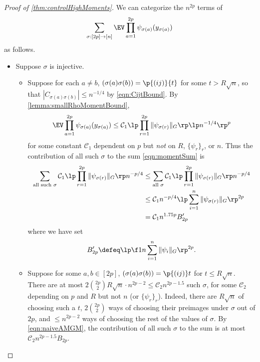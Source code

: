 \documentclass[main.tex]{subfiles}
\begin{document}
\begin{proof}[Proof of \cref{thm:controlHighMoments}]
\newcommand{\CC}{\mathcal{C}}

We can categorize the $n^{2p}$ terms of 
\begin{equation}
\sum_{\sigma: [2p] \to [n]} \EV\prod_{a=1}^{2p} \psi_{\sigma(a)}(y_{\sigma(a)})
\label{eqn:momentSum}
\end{equation}
as follows.
\begin{itemize}
    \item Suppose $\sigma$ is injective.
    \begin{itemize}
        \item
            Suppose for each $a\ne b$, $(\sigma(a)\sigma(b)) = \p{(ij)}{t}$ for some $t > R\sqrt n$, so that $|C_{\sigma(a)\sigma(b)}| \le n ^{-1/4}$ by \cref{eqn:CijtBound}.
            By \cref{lemma:smallRhoMomentBound}, 
            \[\EV \prod_{a=1}^{2p} \psi_{\sigma(a)}(y_{\sigma(a)}) \le \CC_1 \lp \prod_{r=1}^{2p} \|\psi_{\sigma(r)}\|_G\rp \lp n^{-1/4} \rp ^{p}\]
            for some constant $\CC_1$ dependent on $p$ but \emph{not} on $R$, $\{\psi_r\}_r$, or $n$.
            Thus the contribution of all such $\sigma$ to the sum \cref{eqn:momentSum} is
            \begin{align*}
                \sum_{\text{all such }\sigma} \CC_1 \lp \prod_{r=1}^{2p} \|\psi_{\sigma(r)}\|_G\rp n^{-p/4}
                    &\le
                        \sum_{\text{all }\sigma} \CC_1 \lp \prod_{r=1}^{2p} \|\psi_{\sigma(r)}\|_G\rp n^{-p/4} 
                        \\
                    &\le 
                        \CC_1 n^{-p/4} \lp \sum_{i=1}^{n} \|\psi_{\sigma(r)}\|_G \rp^{2p}
                        \\
                    &=
                        \CC_1 n^{1.75 p} B'_{2p}
            \end{align*}
            where we have set
            \[B'_{2p} \defeq \lp \f 1 n \sum_{i=1}^{n} \|\psi_{i}\|_G \rp^{2p}.
            \]
        \item
            Suppose for some $a, b \in [2p]$, $(\sigma(a)\sigma(b)) = \p{(ij)}t$ for $t \le R\sqrt n$.
            There are at most $2\binom{2p}2 R \sqrt n \cdot n^{2p-2} \le \CC_2 n^{2p-1.5}$ such $\sigma$, for some $\CC_2$ depending on $p$ and $R$ but not $n$ (or $\{\psi_r\}_r$).
            Indeed, there are $R \sqrt n$ of choosing such a $t$, $2\binom {2p} 2$ ways of choosing their preimages under $\sigma$ out of $2p$, and $\le n^{2p-2}$ ways of choosing the rest of the values of $\sigma$.
            By \cref{eqn:naiveAMGM}, the contribution of all such $\sigma$ to the sum is at most $\CC_2 n^{2p-1.5} B_{2p}.$
            

\end{itemize}
\end{itemize}
\end{proof}
\end{document}

